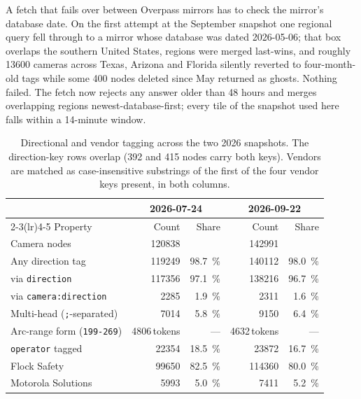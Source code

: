 \documentclass[11pt,twoside]{article}
\begin{document}
A fetch that fails over between Overpass mirrors has to check the mirror's database
date. On the first attempt at the September snapshot one regional query fell through to
a mirror whose database was dated 2026-05-06; that box overlaps the southern United
States, regions were merged last-wins, and roughly \num{13600} cameras across Texas,
Arizona and Florida silently reverted to four-month-old tags while some \num{400} nodes
deleted since May returned as ghosts. Nothing failed. The fetch now rejects any answer
older than 48 hours and merges overlapping regions newest-database-first; every tile of
the snapshot used here falls within a 14-minute window.

\begin{table}[tbp]
\centering
\small
\caption{Directional and vendor tagging across the two 2026 snapshots. The direction-key rows
overlap (392 and 415 nodes carry both keys). Vendors are matched as case-insensitive
substrings of the first of the four vendor keys present, in both columns.}
\label{tab:tags}
\begin{tabular}{lrrrr}
\toprule
& \multicolumn{2}{c}{2026-07-24} & \multicolumn{2}{c}{2026-09-22} \\
\cmidrule(lr){2-3}\cmidrule(lr){4-5}
Property & Count & Share & Count & Share \\
\midrule
Camera nodes                        & \num{120838} &                     & \num{142991} & \\
Any direction tag                   & \num{119249} & \SI{98.7}{\percent} & \num{140112} & \SI{98.0}{\percent} \\
\quad via \texttt{direction}        & \num{117356} & \SI{97.1}{\percent} & \num{138216} & \SI{96.7}{\percent} \\
\quad via \texttt{camera:direction} & \num{2285}   & \SI{1.9}{\percent}  & \num{2311}   & \SI{1.6}{\percent} \\
Multi-head (\texttt{;}-separated)   & \num{7014}   & \SI{5.8}{\percent}  & \num{9150}   & \SI{6.4}{\percent} \\
Arc-range form (\texttt{199-269})   & \num{4806}\,tokens & ---           & \num{4632}\,tokens & --- \\
\texttt{operator} tagged            & \num{22354}  & \SI{18.5}{\percent} & \num{23872}  & \SI{16.7}{\percent} \\
\midrule
Flock Safety                        & \num{99650}  & \SI{82.5}{\percent} & \num{114360} & \SI{80.0}{\percent} \\
Motorola Solutions                  & \num{5993}   & \SI{5.0}{\percent}  & \num{7411}   & \SI{5.2}{\percent} \\

\end{tabular}
\end{table}
\end{document}
